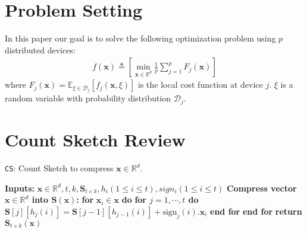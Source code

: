 
\section{Problem Setting}
In this paper our goal is to solve the following optimization problem using $p$ distributed devices:
\begin{align}
    f(\boldsymbol{x})\triangleq \left[\min_{\boldsymbol{x}\in \mathbb{R}^{d}}\frac{1}{p}\sum_{j=1}^{p}F_j(\boldsymbol{x})\right]
\end{align}
where $F_j(\boldsymbol{x})=\mathbb{E}_{\xi\in\mathcal{D}_j}\left[f_j\left(\boldsymbol{x},\xi\right)\right]$ is the local cost function at device $j$. $\xi$ is a random variable with probability distribution $\mathcal{D}_j$.



\section{Count Sketch Review}

\begin{algorithm}[H]
\caption{\texttt{CS}: Count Sketch to compress ${\boldsymbol{x}}\in\mathbb{R}^{d}$. }\label{Alg:csketch}
\begin{algorithmic}[1]
\State \textbf{Inputs:} $\boldsymbol{x}\in\mathbb{R}^{d}, t, k, \mathbf{S}_{t\times k}, h_i (1\leq i\leq t), sign_i (1\leq i\leq t)$
\State \textbf{Compress vector $\boldsymbol{x}\in\mathbb{R}^{d}$ into $\mathbf{S}\left(\boldsymbol{x}\right)$:}
\State \textbf{for} $\boldsymbol{x}_i\in\boldsymbol{x}$ \textbf{do}
\State \quad\textbf{for $j=1,\cdots,t$ do}
\State \quad\quad $\mathbf{S}[j][h_j(i)]=\mathbf{S}[j-1][h_{j-1}(i)]+\text{sign}_j(i).\boldsymbol{x}_i$ 
\State \quad\textbf{end for}
\State \textbf{end for}
\State \textbf{return} $\mathbf{S}_{t\times k}(\boldsymbol{x})$
\end{algorithmic}
\end{algorithm}
